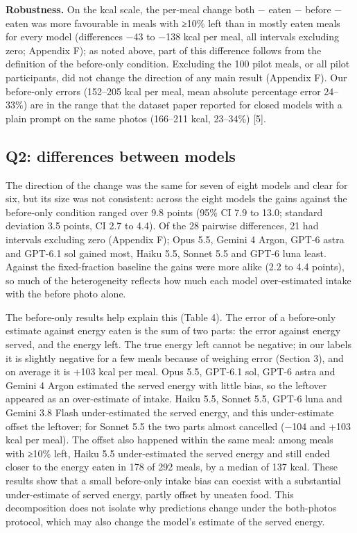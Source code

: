 \documentclass[
  11pt,
  letterpaper]{article}
\begin{document}
\textbf{Robustness.} On the kcal scale, the per-meal change \textbar both − eaten\textbar{} − \textbar before
− eaten\textbar{} was more favourable in meals with ≥10\% left than in mostly eaten meals for every model
(differences −43 to −138 kcal per meal, all intervals excluding zero; Appendix F); as noted above, part of
this difference follows from the definition of the before-only condition. Excluding the 100 pilot meals, or
all pilot participants, did not change the direction of any main result (Appendix F). Our before-only errors
(152--205 kcal per meal, mean absolute percentage error 24--33\%) are in the range that the dataset paper
reported for closed models with a plain prompt on the same photos (166--211 kcal, 23--34\%) {[}5{]}.

\subsection{Q2: differences between models}\label{q2-differences-between-models}

The direction of the change was the same for seven of eight models and clear for six, but its size was not
consistent: across the eight models the gains against the before-only condition ranged over 9.8 points (95\%
CI 7.9 to 13.0; standard deviation 3.5 points, CI 2.7 to 4.4). Of the 28 pairwise differences, 21 had
intervals excluding zero (Appendix F); Opus 5.5, Gemini 4 Argon, GPT-6 astra and GPT-6.1 sol gained most,
Haiku 5.5, Sonnet 5.5 and GPT-6 luna least. Against the fixed-fraction baseline the gains were more alike (2.2
to 4.4 points), so much of the heterogeneity reflects how much each model over-estimated intake with the
before photo alone.

The before-only results help explain this (Table 4). The error of a before-only estimate against energy eaten
is the sum of two parts: the error against energy served, and the energy left. The true energy left cannot be
negative; in our labels it is slightly negative for a few meals because of weighing error (Section 3), and on
average it is +103 kcal per meal. Opus 5.5, GPT-6.1 sol, GPT-6 astra and Gemini 4 Argon estimated the served
energy with little bias, so the leftover appeared as an over-estimate of intake. Haiku 5.5, Sonnet 5.5, GPT-6
luna and Gemini 3.8 Flash under-estimated the served energy, and this under-estimate offset the leftover; for
Sonnet 5.5 the two parts almost cancelled (−104 and +103 kcal per meal). The offset also happened within the
same meal: among meals with ≥10\% left, Haiku 5.5 under-estimated the served energy and still ended closer to
the energy eaten in 178 of 292 meals, by a median of 137 kcal. These results show that a small before-only
intake bias can coexist with a substantial under-estimate of served energy, partly offset by uneaten food.
This decomposition does not isolate why predictions change under the both-photos protocol, which may also
change the model's estimate of the served energy.
\end{document}
